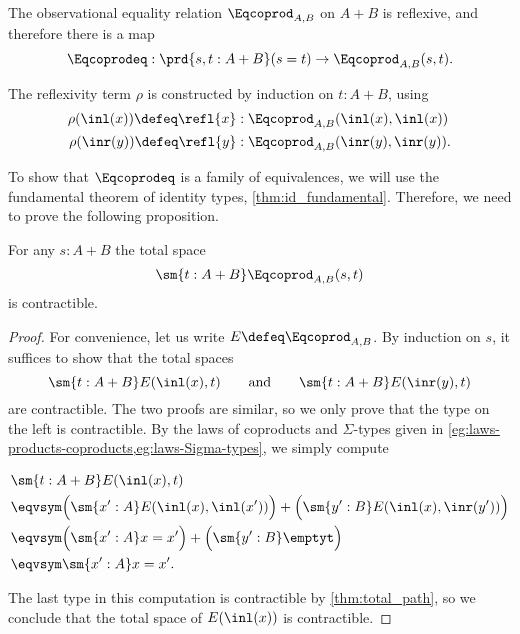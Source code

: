 \begin{lem}
The observational equality relation $\Eqcoprod_{A,B}$ on $A+B$ is reflexive, and therefore there is a map
\begin{equation*}
\Eqcoprodeq:\prd{s,t:A+B} (s=t)\to \Eqcoprod_{A,B}(s,t).
\end{equation*}
\end{lem}

\begin{constr}
The reflexivity term $\rho$ is constructed by induction on $t:A+B$, using
\begin{align*}
\rho(\inl(x))\defeq \refl{x}  & : \Eqcoprod_{A,B}(\inl(x),\inl(x)) \\
\rho(\inr(y))\defeq \refl{y} & : \Eqcoprod_{A,B}(\inr(y),\inr(y)).\qedhere
\end{align*}
\end{constr}

To show that $\Eqcoprodeq$ is a family of equivalences, we will use the fundamental theorem of identity types, \cref{thm:id_fundamental}. Therefore, we need to prove the following proposition.

\begin{prp}\label{lem:is-contr-total-eq-coprod}
For any $s:A+B$ the total space
\begin{equation*}
\sm{t:A+B}\Eqcoprod_{A,B}(s,t)
\end{equation*}
is contractible.
\end{prp}

\begin{proof}
  For convenience, let us write $E\defeq \Eqcoprod_{A,B}$. By induction on $s$, it suffices to show that the total spaces
  \begin{equation*}
    \sm{t:A+B}E(\inl(x),t) \qquad\text{and}\qquad \sm{t:A+B}E(\inr(y),t)
  \end{equation*}
  are contractible. The two proofs are similar, so we only prove that the type on the left is contractible. By the laws of coproducts and $\Sigma$-types given in \cref{eg:laws-products-coproducts,eg:laws-Sigma-types}, we simply compute
  \begin{samepage}
    \begin{align*}
      & \sm{t:A+B}E(\inl(x),t) \\
      & \eqvsym \Big(\sm{x':A}E(\inl(x),\inl(x'))\Big)+\Big(\sm{y':B}E(\inl(x),\inr(y'))\Big) \\
      & \eqvsym \Big(\sm{x':A}x=x'\Big)+\Big(\sm{y':B}\emptyt\Big) \\
      & \eqvsym \sm{x':A}x=x'.
    \end{align*}%
  \end{samepage}%
  The last type in this computation is contractible by \cref{thm:total_path}, so we conclude that the total space of $E(\inl(x))$ is contractible.
\end{proof}

